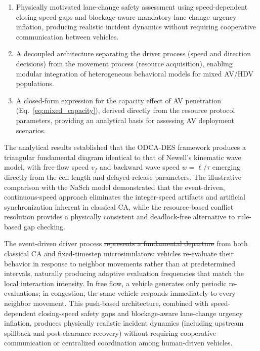 \documentclass[review,authoryear]{elsarticle}
\providecommand{\DIFaddtex}[1]{{\protect\color{blue}\uwave{#1}}} %
\providecommand{\DIFdeltex}[1]{{\protect\color{red}\sout{#1}}}                      %
\providecommand{\DIFaddbegin}{} %
\providecommand{\DIFaddend}{} %
\providecommand{\DIFdelbegin}{} %
\providecommand{\DIFdelend}{} %
\providecommand{\DIFadd}[1]{\texorpdfstring{\DIFaddtex{#1}}{#1}} %
\providecommand{\DIFdel}[1]{\texorpdfstring{\DIFdeltex{#1}}{}} %
\newcommand{\DIFscaledelfig}{0.5}
\newlength{\DIFdelgraphicswidth} %
\newlength{\DIFdelgraphicsheight} %
\newcommand{\DIFaddincludegraphics}[2][]{{\color{blue}\fbox{\DIFOincludegraphics[#1]{#2}}}} %
\newcommand{\DIFdelincludegraphics}[2][]{%
\sbox{\DIFdelgraphicsbox}{\DIFOincludegraphics[#1]{#2}}%
\settoboxwidth{\DIFdelgraphicswidth}{\DIFdelgraphicsbox} %
\settoboxtotalheight{\DIFdelgraphicsheight}{\DIFdelgraphicsbox} %
\scalebox{\DIFscaledelfig}{%
\parbox[b]{\DIFdelgraphicswidth}{\usebox{\DIFdelgraphicsbox}\\[-\baselineskip] \rule{\DIFdelgraphicswidth}{0em}}\llap{\resizebox{\DIFdelgraphicswidth}{\DIFdelgraphicsheight}{%
\setlength{\unitlength}{\DIFdelgraphicswidth}%
\begin{picture}(1,1)%
\thicklines\linethickness{2pt} %
{\color[rgb]{1,0,0}\put(0,0){\framebox(1,1){}}}%
{\color[rgb]{1,0,0}\put(0,0){\line( 1,1){1}}}%
{\color[rgb]{1,0,0}\put(0,1){\line(1,-1){1}}}%
\end{picture}%
}\hspace*{3pt}}} %
} %
\DeclareRobustCommand{\DIFaddbegin}{\DIFOaddbegin \let\includegraphics\DIFaddincludegraphics} %
\DeclareRobustCommand{\DIFaddend}{\DIFOaddend \let\includegraphics\DIFOincludegraphics} %
\DeclareRobustCommand{\DIFdelbegin}{\DIFOdelbegin \let\includegraphics\DIFdelincludegraphics} %
\DeclareRobustCommand{\DIFdelend}{\DIFOaddend \let\includegraphics\DIFOincludegraphics} %
\begin{document}
\begin{enumerate}
    \item Physically motivated lane-change safety assessment using speed-dependent closing-speed gaps and blockage-aware mandatory lane-change urgency inflation, producing realistic incident dynamics without requiring cooperative communication between vehicles.

    \item A decoupled architecture separating the driver process (speed and direction decisions) from the movement process (resource acquisition), enabling modular integration of heterogeneous behavioral models for mixed AV/HDV populations.

    \item A closed-form expression for the capacity effect of AV penetration (Eq.~\ref{eq:mixed_capacity}), derived directly from the resource protocol parameters, providing an analytical basis for assessing AV deployment scenarios.
\end{enumerate}

The analytical results established that the ODCA-DES framework produces a triangular fundamental diagram identical to that of Newell's kinematic wave model, with free-flow speed $v_f$ and backward wave speed $w = \ell/\tau$ emerging directly from the cell length and delayed-release parameters. The illustrative comparison with the NaSch model demonstrated that the event-driven, continuous-speed approach eliminates the integer-speed artifacts and artificial synchronization inherent in classical CA, while the resource-based conflict resolution provides a physically consistent and deadlock-free alternative to rule-based gap checking.

The event-driven driver process \DIFdelbegin \DIFdel{represents a fundamental departure }\DIFdelend \DIFaddbegin \DIFadd{differs fundamentally }\DIFaddend from both classical CA and fixed-timestep microsimulators: vehicles re-evaluate their behavior in response to neighbor movements rather than at predetermined intervals, naturally producing adaptive evaluation frequencies that match the local interaction intensity. In free flow, a vehicle generates only periodic re-evaluations; in congestion, the same vehicle responds immediately to every neighbor movement. This push-based architecture, combined with speed-dependent closing-speed safety gaps and blockage-aware lane-change urgency inflation, produces physically realistic incident dynamics (including upstream spillback and post-clearance recovery) without requiring cooperative communication or centralized coordination among human-driven vehicles.
\end{document}
